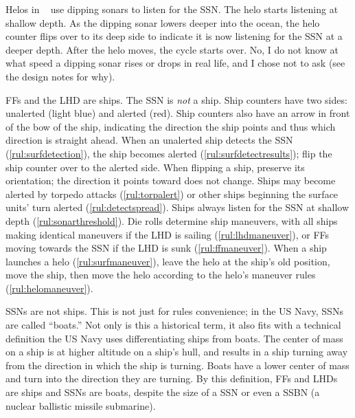 \documentclass[../TacSubMicroRules.tex]{subfiles}
\begin{document}
\begin{design}
    Helos in \gametitle~ use dipping sonars to listen for the SSN.
    The helo starts listening at shallow depth.
    As the dipping sonar lowers deeper into the ocean, the helo counter flips over to its deep side to indicate it is now listening for the SSN at a deeper depth.
    After the helo moves, the cycle starts over.
    No, I do not know at what speed a dipping sonar rises or drops in real life, and I chose not to ask (see the design notes for why).
\end{design}

 FFs and the LHD are ships.
The SSN is \emph{not} a ship.
Ship counters have two sides: unalerted (light blue) and alerted (red).
Ship counters also have an arrow in front of the bow of the ship, indicating the direction the ship points and thus which direction is straight ahead.
When an unalerted ship detects the SSN (\ref{rul:surfdetection}), the ship becomes alerted (\ref{rul:surfdetectresults}); flip the ship counter over to the alerted side.
When flipping a ship, preserve its orientation; the direction it points toward does not change.
Ships may become alerted by torpedo attacks (\ref{rul:torpalert}) or other ships beginning the surface units' turn alerted (\ref{rul:detectspread}).
Ships always listen for the SSN at shallow depth (\ref{rul:sonarthreshold}).
Die rolls determine ship maneuvers, with all ships making identical maneuvers if the LHD is sailing (\ref{rul:lhdmaneuver}), or FFs moving towards the SSN if the LHD is sunk (\ref{rul:ffmaneuver}).
When a ship launches a helo (\ref{rul:surfmaneuver}), leave the helo at the ship's old position, move the ship, then move the helo according to the helo's maneuver rules (\ref{rul:helomaneuver}).

\begin{design}
    SSNs are not ships.
    This is not just for rules convenience; in the US Navy, SSNs are called ``boats.''
    Not only is this a historical term, it also fits with a technical definition the US Navy uses differentiating ships from boats.
    The center of mass on a ship is at higher altitude on a ship's hull, and results in a ship turning away from the direction in which the ship is turning.
    Boats have a lower center of mass and turn into the direction they are turning.
    By this definition, FFs and LHDs are ships and SSNs are boats, despite the size of a SSN or even a SSBN (a nuclear ballistic missile submarine).
\end{design}
\end{document}
